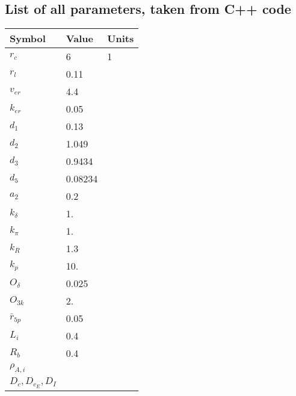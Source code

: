 \documentclass[11pt]{article}
\begin{document}
\subsection{List of all parameters, taken from C++ code}
\begin{table}[h]
\begin{tabular}{|lll|}
\hline
Symbol & Value & Units \\ \hline
$r_c$ & 6 & 1 \\
$r_l$ & 0.11  &\\
$v_{er}$ & 4.4  &\\
$k_{er}$ & 0.05 &\\ \hline
$d_{1}$ & 0.13  &\\
$d_{2}$ & 1.049  &\\
$d_{3}$ & 0.9434 &\\
$d_{5}$ &  0.08234 &\\ \hline
$a_{2}$ &  0.2 &\\
$k_{\delta}$ & 1. &\\
$k_{\pi}$ & 1. &\\
$k_R$ & 1.3 &\\
$k_p$ & 10. &\\
$O_{\delta}$ & 0.025 &\\
$O_{3k}$ & 2. &\\
$\bar{r}_{5p}$ & 0.05 &  \\ \hline
$L_i$ & 0.4 & \\ 
$R_b$ & 0.4 & \\  
$\rho_{A,i}$ & & \\  
$D_c, D_{c_E}, D_I$ & & \\ \hline
\end{tabular}
\end{table}

\end{document}
